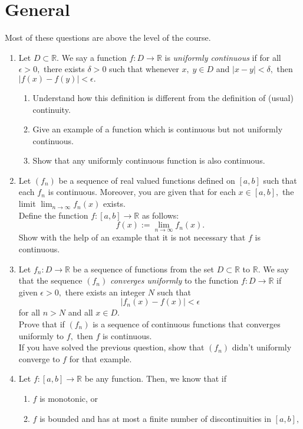 \documentclass{article}
\begin{document}
\section{General}
Most of these questions are above the level of the course.
\begin{enumerate} 
	\item Let $D \subset \mathbb{R}.$ We say a function $f : D \to \mathbb{R}$ is \emph{uniformly continuous} if for all $\epsilon > 0,$ there exists $\delta > 0$ such that whenever $x,\;y \in D$ and $|x - y| < \delta,$ then $|f(x) - f(y)| < \epsilon.$
	\begin{enumerate} 
		\item Understand how this definition is different from the definition of (usual) continuity.
		\item Give an example of a function which is continuous but not uniformly continuous.
		\item Show that any uniformly continuous function is also continuous.
	\end{enumerate}
	\item Let $(f_n)$ be a sequence of real valued functions defined on $[a, b]$ such that each $f_n$ is continuous. Moreover, you are given that for each $x \in [a, b],$ the limit $\displaystyle\lim_{n\to \infty}f_n(x)$ exists. \\
	Define the function $f : [a, b] \to \mathbb{R}$ as follows:
	\[f(x) := \lim_{n\to \infty}f_n(x).\]
	Show with the help of an example that it is not necessary that $f$ is continuous.
	\item Let $f_n : D \to \mathbb{R}$ be a sequence of functions from the set $D \subset \mathbb{R}$ to $\mathbb{R}.$ We say that the sequence $(f_n)$ \emph{converges uniformly} to the function $f:D \to \mathbb{R}$ if given $\epsilon > 0,$ there exists an integer $N$ such that
	\[|f_n(x) - f(x)| < \epsilon\]
	for all $n > N$ and all $x \in D.$\\
	Prove that if $(f_n)$ is a sequence of continuous functions that converges uniformly to $f,$ then $f$ is continuous.\\
	If you have solved the previous question, show that $(f_n)$ didn't uniformly converge to $f$ for that example.
	\item Let $f:[a, b] \to \mathbb{R}$ be any function. Then, we know that if
	\begin{enumerate} 
		\item $f$ is monotonic, or
		\item $f$ is bounded and has at most a finite number of discontinuities in $[a, b],$

\end{enumerate}
\end{enumerate}
\end{document}
